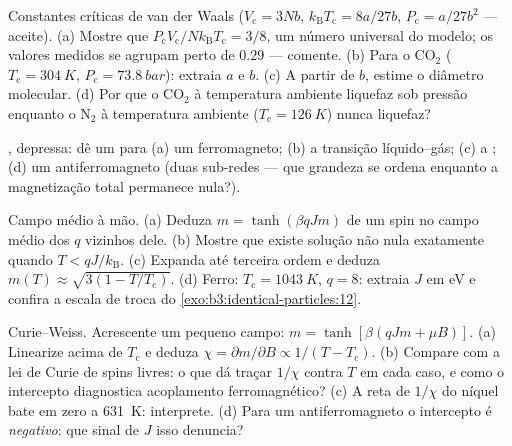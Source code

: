 \begin{exercise}[$\star$]\label{exo:b3:phase-transitions:3}
Constantes críticas de van der Waals ($V_{\text{c}} = 3Nb$,
$k_{\text{B}}T_{\text{c}} = 8a/27b$, $P_{\text{c}} = a/27b^2$ ---
aceite). (a) Mostre que $P_{\text{c}}V_{\text{c}}/Nk_{\text{B}}T_{\text{
c}} = 3/8$, um número universal do modelo; os valores medidos
se agrupam perto de $0.29$ --- comente. (b) Para o CO$_2$
($T_{\text{c}} = \qty{304}{K}$, $P_{\text{c}} = \qty{73.8}{bar}$):
extraia $a$ e $b$. (c) A partir de $b$, estime o diâmetro
molecular. (d) Por que o CO$_2$ à temperatura ambiente liquefaz sob
pressão enquanto o N$_2$ à temperatura ambiente ($T_{\text{c}} =
\qty{126}{K}$) nunca liquefaz?
\end{exercise}

\begin{exercise}[$\star$]\label{exo:b3:phase-transitions:4}
, depressa: dê um para (a) um ferromagneto; (b)
a transição líquido--gás; (c) a ; (d)
um antiferromagneto (duas sub-redes --- que grandeza se ordena enquanto
a magnetização total permanece nula?).
\end{exercise}

\begin{exercise}[$\star\star$]\label{exo:b3:phase-transitions:5}
Campo médio à mão. (a) Deduza $m = \tanh(\beta qJm)$ de um spin
no campo médio dos $q$ vizinhos dele. (b) Mostre que existe solução não
nula exatamente quando $T < qJ/k_{\text{B}}$. (c) Expanda até
terceira ordem e deduza $m(T) \approx \sqrt{3(1 -
T/T_{\text{c}})}$. (d) Ferro: $T_{\text{c}} = \qty{1043}{K}$, $q =
8$: extraia $J$ em eV e confira a escala de troca do
\cref{exo:b3:identical-particles:12}.
\end{exercise}

\begin{exercise}[$\star\star$]\label{exo:b3:phase-transitions:6}
Curie--Weiss. Acrescente um pequeno campo: $m = \tanh[\beta(qJm + \mu B)]$.
(a) Linearize acima de $T_{\text{c}}$ e deduza $\chi = \partial
m/\partial B \propto 1/(T - T_{\text{c}})$. (b) Compare com a
lei de Curie de spins livres: o que dá traçar $1/\chi$ contra $T$
em cada caso, e como o intercepto diagnostica acoplamento
ferromagnético? (c) A reta de $1/\chi$ do níquel bate em zero a \qty{631}{K}:
interprete. (d) Para um antiferromagneto o intercepto é
\emph{negativo}: que sinal de $J$ isso denuncia?
\end{exercise}

